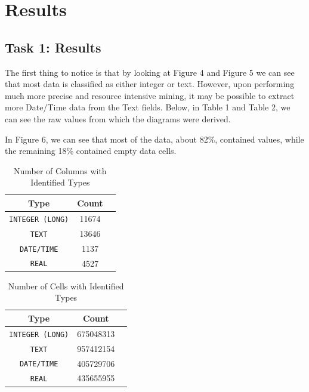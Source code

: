 \documentclass[sigconf,authordraft]{acmart}
\begin{document}
\section{Results}
\subsection{Task 1: Results}
The first thing to notice is that by looking at Figure 4 and Figure 5 we can see that most data is classified as either integer or text. However, upon performing much more precise and resource intensive mining, it may be possible to extract more Date/Time data from the Text fields. Below, in Table 1 and Table 2, we can see the raw values from which the diagrams were derived.

In Figure 6, we can see that most of the data, about 82\%, contained values, while the remaining 18\% contained empty data cells.

\begin{table}[h]
  \caption{Number of Columns with Identified Types}
  \label{tab:commands}
  \begin{tabular}{ccl}
    \toprule
    Type & Count\\
    \midrule
    \texttt{INTEGER (LONG)} & 11674 \\
    \texttt{TEXT} & 13646\\
    \texttt{DATE/TIME} &1137\\
    \texttt{REAL} & 4527\\
    \bottomrule
  \end{tabular}
\end{table}

\begin{table}[H]
  \caption{Number of Cells with Identified Types}
  \label{tab:commands}
  \begin{tabular}{ccl}
    \toprule
    Type & Count\\
    \midrule
    \texttt{INTEGER (LONG)} & 675048313 \\
    \texttt{TEXT} & 957412154 \\
    \texttt{DATE/TIME} & 405729706\\
    \texttt{REAL} & 435655955\\
    \bottomrule
  \end{tabular}
\end{table}
\end{document}

